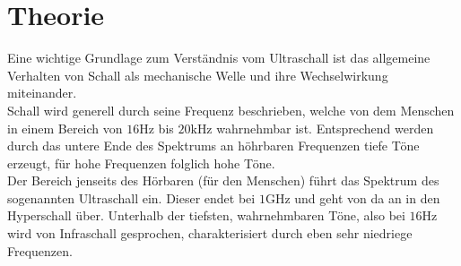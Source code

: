 \section{Theorie}
Eine wichtige Grundlage zum Verständnis vom Ultraschall ist das allgemeine Verhalten von Schall als mechanische Welle 
und ihre Wechselwirkung miteinander. \\ 
Schall wird generell durch seine Frequenz beschrieben, welche von dem Menschen in einem Bereich von $16 \si{\hertz}$ bis $20 \si{\kilo\hertz}$
wahrnehmbar ist. Entsprechend werden durch das untere Ende des Spektrums an höhrbaren Frequenzen tiefe Töne erzeugt,
für hohe Frequenzen folglich hohe Töne. \\
Der Bereich jenseits des Hörbaren (für den Menschen) führt das Spektrum des sogenannten Ultraschall ein. Dieser endet bei 
$1 \si{\giga\hertz} $ und geht von da an in den Hyperschall über. Unterhalb der tiefsten, wahrnehmbaren Töne, also bei $16 \si{\hertz}$
wird von Infraschall gesprochen, charakterisiert durch eben sehr niedriege Frequenzen.

